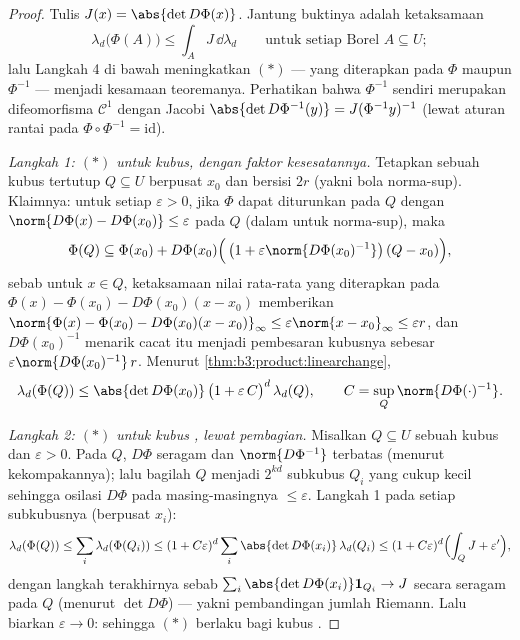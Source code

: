 \begin{proof}
Tulis $J(x) = \abs{\det D\Phi(x)}$. Jantung buktinya adalah
ketaksamaan
\[
\lambda_d\bigl(\Phi(A)\bigr) \leq \int_A J\,\dd\lambda_d
\qquad\text{untuk setiap Borel } A \subseteq U;
\tag{$*$}
\]
lalu Langkah 4 di bawah meningkatkan $(*)$ --- yang diterapkan pada $\Phi$ maupun
$\Phi^{-1}$ --- menjadi kesamaan teoremanya. Perhatikan bahwa
$\Phi^{-1}$ sendiri merupakan difeomorfisma $\mathcal C^1$ dengan
Jacobi $\abs{\det D\Phi^{-1}(y)} = J(\Phi^{-1}y)^{-1}$
(lewat aturan rantai pada $\Phi\circ\Phi^{-1} = \mathrm{id}$).

\emph{Langkah 1: $(*)$ untuk kubus, dengan faktor kesesatannya.} Tetapkan sebuah
kubus tertutup $Q \subseteq U$ berpusat $x_0$ dan bersisi $2r$
(yakni bola norma-sup). Klaimnya: untuk setiap $\varepsilon > 0$, jika $\Phi$
dapat diturunkan pada $Q$ dengan
$\norm{D\Phi(x) - D\Phi(x_0)} \leq \varepsilon$ pada $Q$
(dalam  untuk norma-sup), maka
\[
\Phi(Q) \subseteq \Phi(x_0) + D\Phi(x_0)\Bigl(\,\bigl(1 +
\varepsilon\norm{D\Phi(x_0)^{-1}}\bigr)\,(Q - x_0)\Bigr),
\]
sebab untuk $x \in Q$, ketaksamaan nilai rata-rata yang diterapkan pada
$\Phi(x) - \Phi(x_0) - D\Phi(x_0)(x - x_0)$ memberikan
$\norm{\Phi(x) - \Phi(x_0) - D\Phi(x_0)(x-x_0)}_\infty \leq
\varepsilon\norm{x - x_0}_\infty \leq \varepsilon r$, dan
$D\Phi(x_0)^{-1}$ menarik cacat itu menjadi
pembesaran kubusnya sebesar $\varepsilon\norm{D\Phi(x_0)^{-1}}\,r$.
Menurut \cref{thm:b3:product:linearchange},
\[
\lambda_d(\Phi(Q)) \leq \abs{\det D\Phi(x_0)}\,
\bigl(1 + \varepsilon\,C\bigr)^{d}\,\lambda_d(Q),
\qquad C = \sup_{Q}\norm{D\Phi(\cdot)^{-1}} .
\]

\emph{Langkah 2: $(*)$ untuk kubus , lewat pembagian.} Misalkan $Q
\subseteq U$ sebuah kubus  dan $\varepsilon > 0$. Pada $Q$,
$D\Phi$  seragam dan $\norm{D\Phi^{-1}}$
terbatas (menurut kekompakannya); lalu bagilah $Q$ menjadi $2^{kd}$ subkubus
$Q_i$ yang cukup kecil sehingga osilasi $D\Phi$ pada masing-masingnya
$\leq \varepsilon$. Langkah 1 pada setiap subkubusnya (berpusat $x_i$):
\[
\lambda_d(\Phi(Q)) \leq \sum_i\lambda_d(\Phi(Q_i))
\leq (1 + C\varepsilon)^d \sum_i \abs{\det
D\Phi(x_i)}\,\lambda_d(Q_i)
\leq (1 + C\varepsilon)^d\Bigl(\int_Q J + \varepsilon'\Bigr),
\]
dengan langkah terakhirnya sebab $\sum_i\abs{\det D\Phi(x_i)}\mathbf
1_{Q_i} \to J$ secara seragam pada $Q$ (menurut  $\det D\Phi$)
--- yakni pembandingan jumlah Riemann. Lalu biarkan $\varepsilon \to 0$: sehingga $(*)$
berlaku bagi kubus .


\end{proof}

